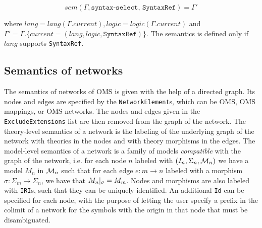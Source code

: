 \documentclass[10pt,fleqn,%
\ifpretendfinal
final%
\else
draft%
\fi,
]{scrreprt}
\newcommand*{\syntax}[1]{\texttt{#1}}
\newcommand{\semdom}[1]{
\begin{center}
\fbox{$#1$}
\end{center}
}
\newcommand{\current}{\mathit{current}}
\newcommand{\ssclause}[1]{\subsection{#1}}
\begin{document}
$$sem(\Gamma,\syntax{syntax-select, SyntaxRef})=\Gamma'$$

\noindent where $lang = lang(\Gamma.\current), logic = logic(\Gamma.\current)$ and\\
$\Gamma'  = \Gamma.\{\current = (lang, logic, \syntax{SyntaxRef})\}$. 
The semantics is defined only if $\mathit{lang}$ supports \syntax{SyntaxRef}.

%

%

\ssclause{Semantics of networks}

The semantics of networks of OMS is given with the help of a directed graph. Its nodes
and edges are specified by the \syntax{NetworkElement}s, which can be OMS, OMS mappings,
or OMS networks. The nodes and edges given in the \syntax{ExcludeExtensions} list are then removed from
the graph of the network. The theory-level semantics of a network is the labeling of the 
underlying graph of the network with theories in the nodes and with theory morphisms in the edges.
The model-level semantics of a network is a family of models \emph{compatible} with the
graph of the network, i.e. for each node $n$ labeled with $(I_n, \Sigma_n, {\cal M}_n)$ we have a model
$M_n$ in ${\cal M}_n$ such that for each edge $e:m \rightarrow n$ labeled with a 
morphism $\sigma: \Sigma_m \rightarrow \Sigma_n$, we have that $M_n|_{\sigma} = M_m$.
Nodes and morphisms are also labeled with \syntax{IRI}s, such that they can be uniquely identified.
An additional \syntax{Id} can be specified for each node, with the purpose of letting the user specify a 
prefix in the colimit of a network for the symbols with the origin in that node that must be disambiguated.
\end{document}
